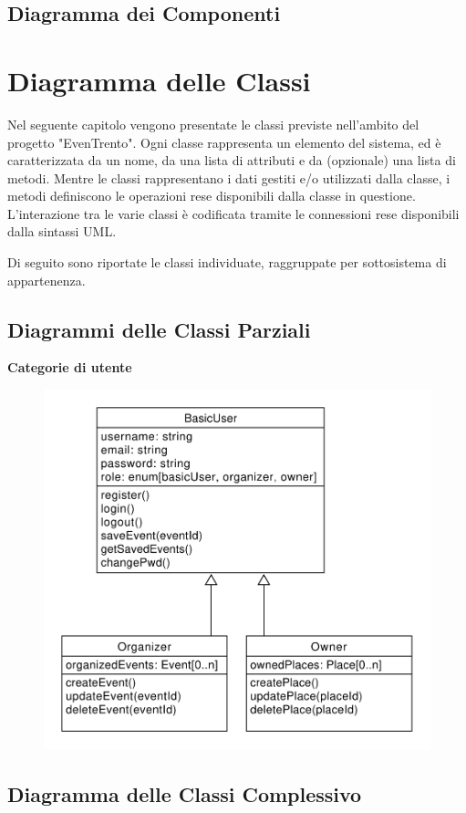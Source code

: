 \documentclass[9pt]{extarticle}
\begin{document}
\subsection{Diagramma dei Componenti}

\section{Diagramma delle Classi}

Nel seguente capitolo vengono presentate le classi previste nell'ambito del progetto "EvenTrento". Ogni classe rappresenta un elemento del sistema, ed è caratterizzata da un nome, da una lista di attributi e da (opzionale) una lista di metodi.
Mentre le classi rappresentano i dati gestiti e/o utilizzati dalla classe, i metodi definiscono le operazioni rese disponibili dalla classe in questione. L'interazione tra le varie classi è codificata tramite le connessioni rese disponibili dalla sintassi UML.

Di seguito sono riportate le classi individuate, raggruppate per sottosistema di appartenenza.

\subsection{Diagrammi delle Classi Parziali}

\textbf{Categorie di utente}

\begin{figure}[!htb]
	\centering
	\includegraphics[width=.6\linewidth]{./images/classDiagramUsers.pdf}
	\label{fig:classDiagramUsers}
\end{figure}


\subsection{Diagramma delle Classi Complessivo}
\end{document}
